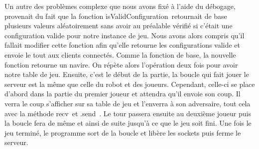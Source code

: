 \documentclass{article}
\begin{document}
	\newline Un autre des probl\`emes complexe que nous avons fix\'e \`a l'aide du d\'ebogage, provenait du fait que la fonction \guillemotleft isValidConfiguration\guillemotright\ retournait de base plusieurs valeurs aléatoirement sans avoir au pr\'ealable v\'erifi\'e si c'\'etait une configuration valide pour notre instance de jeu. Nous avons alors compris qu\textquoteright il fallait modifier cette fonction afin qu'elle retourne les configurations valide et envoie le tout aux clients connect\'es.
	\newline Comme la fonction de base, la nouvelle fonction retourne un navire. On r\'ep\`ete alors l'op\'eration deux fois pour avoir notre table de jeu. Ensuite, c\textquoteright est le d\'ebut de la partie, la boucle qui fait jouer le serveur est la m\^eme que celle du robot et des joueurs. Cependant, celle-ci se place d’abord dans la partie du premier joueur et attendra qu\textquoteright il envoie son coup. Il verra le coup s\textquoteright afficher sur sa table de jeu et l\textquoteright enverra \`a son adversaire, tout cela avec la m\'ethode \guillemotleft recv\guillemotright\ et \guillemotleft.send\guillemotright\ . Le tour passera ensuite au deuxi\`eme joueur puis la boucle fera de m\^eme et ainsi de suite jusqu’à ce que le jeu soit fini. Une fois le jeu termin\'e, le programme sort de la boucle et lib\`ere les sockets puis ferme le serveur.
\end{document}
